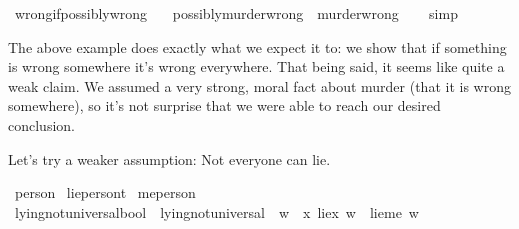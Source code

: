 \begin{isabellebody}
%
\isanewline
\isanewline
{}\isamarkupfalse%
\ wrong{\isacharunderscore}if{\isacharunderscore}possibly{\isacharunderscore}wrong{\isacharcolon}\isanewline
\ \ \ {\isachardoublequoteopen}possibly{\isacharunderscore}murder{\isacharunderscore}wrong\ {\isasymlongrightarrow}\ murder{\isacharunderscore}wrong{\isachardoublequoteclose}\isanewline
%
\isadelimproof
\ \ %
\endisadelimproof
%
\isatagproof
{}\isamarkupfalse%
\ simp\isanewline
%
%
\endisatagproof
{\isafoldproof}%
%
\isadelimproof
%
\endisadelimproof
%
\begin{isamarkuptext}%
The above example does exactly what we expect it to: we show that if something is wrong somewhere 
it's wrong everywhere. That being said, it seems like quite a weak claim. We assumed a very strong, moral 
fact about murder (that it is wrong somewhere), so it's not surprise that we were able to reach our desired conclusion.%
\end{isamarkuptext}\isamarkuptrue%
%
\begin{isamarkuptext}%
Let's try a weaker assumption: Not everyone can lie.%
\end{isamarkuptext}\isamarkuptrue%
\isamarkupfalse%
\ person\isanewline
{}\isamarkupfalse%
\ lie{\isacharcolon}{\isacharcolon}{\isachardoublequoteopen}person{\isasymRightarrow}t{\isachardoublequoteclose}\isanewline
{}\isamarkupfalse%
\ me{\isacharcolon}{\isacharcolon}{\isachardoublequoteopen}person{\isachardoublequoteclose}\isanewline
%
\isanewline
\isanewline
{}\isamarkupfalse%
\ lying{\isacharunderscore}not{\isacharunderscore}universal{\isacharcolon}{\isacharcolon}{\isachardoublequoteopen}bool{\isachardoublequoteclose}\ \ {\isachardoublequoteopen}lying{\isacharunderscore}not{\isacharunderscore}universal\ {\isasymequiv}\ {\isasymforall}w{\isachardot}\ {\isasymnot}\ {\isacharparenleft}{\isacharparenleft}{\isasymforall}x{\isachardot}\ lie{\isacharparenleft}x{\isacharparenright}\ w{\isacharparenright}\ {\isasymand}\ {\isacharparenleft}lie{\isacharparenleft}me{\isacharparenright}\ w{\isacharparenright}{\isacharparenright}{\isachardoublequoteclose}%

\end{isabellebody}
